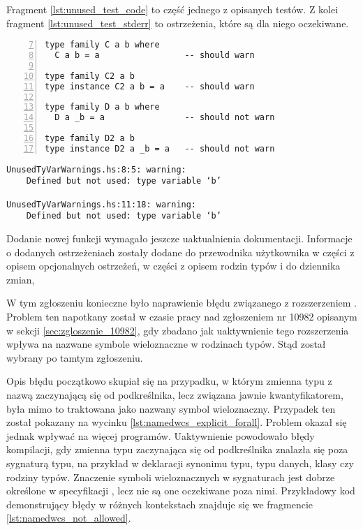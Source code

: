 Fragment \ref{lst:unused_test_code} to część jednego z opisanych testów. Z kolei fragment \ref{lst:unused_test_stderr} to ostrzeżenia, które są dla niego oczekiwane.
\begin{lstlisting}[float,numbers=left,firstnumber=7,label={lst:unused_test_code},
                   caption={Fragment testu \code{UnusedTyVarWarnings} z równaniami wywołującymi ostrzeżenia lub zawierającymi zmienne poprzedzone podkreślnikiem.}]
type family C a b where
  C a b = a                 -- should warn

type family C2 a b
type instance C2 a b = a    -- should warn

type family D a b where
  D a _b = a                -- should not warn

type family D2 a b
type instance D2 a _b = a   -- should not warn
\end{lstlisting}

\begin{lstlisting}[float,language={},label={lst:unused_test_stderr},
                   caption={Ostrzeżenia generowany przez kompilator dla fragmentu \ref{lst:unused_test_code} po wprowadzeniu zmian.}]
UnusedTyVarWarnings.hs:8:5: warning:
    Defined but not used: type variable ‘b’

UnusedTyVarWarnings.hs:11:18: warning:
    Defined but not used: type variable ‘b’
\end{lstlisting}

Dodanie nowej funkcji wymagało jeszcze uaktualnienia dokumentacji. Informacje o
dodanych ostrzeżeniach zostały dodane do przewodnika użytkownika w części z
opisem opcjonalnych ostrzeżeń, w części z opisem rodzin typów i do dziennika
zmian,


\label{sec:zgloszenie_11098}

W tym zgłoszeniu konieczne było naprawienie błędu związanego z rozszerzeniem
. Problem ten napotkany został w czasie pracy nad
zgłoszeniem nr 10982 opisanym w sekcji \ref{sec:zgloszenie_10982}, gdy zbadano
jak uaktywnienie tego rozszerzenia wpływa na nazwane symbole wieloznaczne w
rodzinach typów. Stąd został wybrany po tamtym zgłoszeniu.

Opis błędu początkowo skupiał się na przypadku, w którym zmienna typu z nazwą
zaczynającą się od podkreślnika, lecz związana jawnie kwantyfikatorem, była mimo
to traktowana jako nazwany symbol wieloznaczny. Przypadek ten został pokazany na
wycinku \ref{lst:namedwcs_explicit_forall}. Problem okazał się jednak wpływać na
więcej programów. Uaktywnienie  powodowało błędy
kompilacji, gdy zmienna typu zaczynająca się od podkreślnika znalazła się poza
sygnaturą typu, na przykład w deklaracji synonimu typu, typu danych, klasy czy
rodziny typów. Znaczenie symboli wieloznacznych w sygnaturach jest dobrze
określone w specyfikacji , lecz nie są one
oczekiwane poza nimi. Przykładowy kod demonstrujący błędy w różnych kontekstach
znajduje się we fragmencie \ref{lst:namedwcs_not_allowed}.


